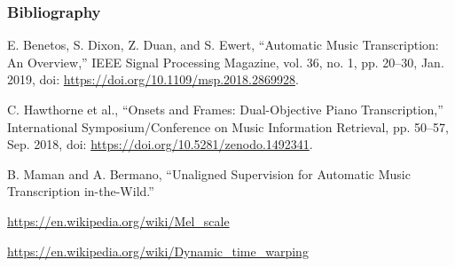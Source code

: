 \documentclass{beamer}
\newcommand{\emp}[1]{\textcolor{tum}{\textbf{#1}}}
\begin{document}
\begin{frame}[allowframebreaks]%
	\frametitle{Bibliography}



	
	\begin{thebibliography}{BenetosMusicTranscription}

		E. Benetos, S. Dixon, Z. Duan, and S. Ewert, “Automatic Music Transcription: An Overview,” IEEE Signal Processing Magazine, vol. 36, no. 1, pp. 20–30, Jan. 2019, doi: \url{https://doi.org/10.1109/msp.2018.2869928}.

		C. Hawthorne et al., “Onsets and Frames: Dual-Objective Piano Transcription,” International Symposium/Conference on Music Information Retrieval, pp. 50–57, Sep. 2018, doi: \url{https://doi.org/10.5281/zenodo.1492341}.

		B. Maman and A. Bermano, “Unaligned Supervision for Automatic Music Transcription in-the-Wild.”

		\url{https://en.wikipedia.org/wiki/Mel_scale}

		\url{https://en.wikipedia.org/wiki/Dynamic_time_warping}

	\end{thebibliography}
\end{frame}
\end{document}
